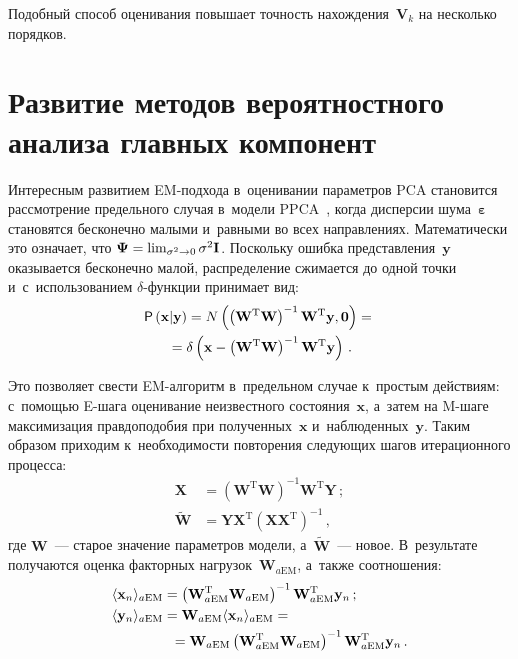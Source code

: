 \begin{multicols}{2}
     Подобный способ оценивания повышает точность 
нахождения~$\mathbf{V}_k$ на несколько порядков.
     
\section{Развитие методов вероятностного анализа главных компонент}

     Интересным развитием EM-под\-хо\-да в~оценивании параметров PCA 
становится рассмотрение предель\-ного случая в~модели PPCA~\cite{5-kri}, когда 
дис\-пер\-сии шума~${\boldsymbol{\varepsilon}}$ становятся бесконечно малыми и~равными во всех направлениях. Математически это означает, что 
${\boldsymbol{\Psi}}\hm= \lim\nolimits_{\sigma^2\to 0} \sigma^2\mathbf{I}$. 
Поскольку ошибка представления~$\mathbf{y}$ оказывается бесконечно малой, 
распределение сжимается до одной точки и~с~использованием  
$\delta$-функ\-ции принимает вид:
     \begin{multline*}
     {\sf P}\left(\mathbf{x}\vert \mathbf{y}\right) 
=N\left(\left(\mathbf{W}^{\mathrm{T}}\mathbf{W}\right)^{-1} 
\mathbf{W}^{\mathrm{T}} \mathbf{y},\mathbf{0}\right)={}\\
{}=\delta
     \left(\mathbf{x} -\left(\mathbf{W}^{\mathrm{T}} \mathbf{W}\right)^{-1} 
\mathbf{W}^{\mathrm{T}} \mathbf{y}\right)\,.
     \end{multline*}
     
     Это позволяет свести EM-ал\-го\-ритм в~предельном случае к~простым 
действиям: с~по\-мощью \mbox{E-ша}\-га оценивание неизвестного 
состояния~$\mathbf{x}$, а~затем на M-ша\-ге максимизация правдоподобия 
при полученных~$\mathbf{x}$ и~наблюденных~$\mathbf{y}$. Таким образом 
приходим к~необходимости повторения следующих шагов итерационного 
процесса:
     \begin{align*}
     \mathbf{X} &= \left(\mathbf{W}^{\mathrm{T}} \mathbf{W}\right)^{-1} 
\mathbf{W}^{\mathrm{T}} \mathbf{Y}\,;\\
     \widetilde{\mathbf{W}} &= \mathbf{YX}^{\mathrm{T}} 
\left(\mathbf{XX}^{\mathrm{T}}\right)^{-1}\,,
     \end{align*}
где $\mathbf{W}$~--- старое значение параметров модели, 
а~$\widetilde{\mathbf{W}}$~--- новое. В~результате получаются оценка 
факторных нагрузок~$\mathbf{W}_{a\mathrm{EM}}$, а~также соотношения:
\begin{align*}
\langle \mathbf{x}_n\rangle_{a\mathrm{EM}} &=\left(\mathbf{W}_{a\mathrm{EM}}^{\mathrm{T}} 
\mathbf{W}_{a\mathrm{EM}}\right)^{-1} \mathbf{W}^{\mathrm{T}}_{a\mathrm{EM}} \mathbf{y}_n\,;
\\
\langle \mathbf{y}_n\rangle_{a\mathrm{EM}} &=\mathbf{W}_{a\mathrm{EM}} \langle 
\mathbf{x}_n\rangle_{a\mathrm{EM}} = {}\\
&\hspace*{2mm}{}=
\mathbf{W}_{a\mathrm{EM}}\left(\mathbf{W}^{\mathrm{T}}_{a\mathrm{EM}} 
\mathbf{W}_{a\mathrm{EM}}\right)^{-1} \mathbf{W}^{\mathrm{T}}_{a\mathrm{EM}} 
\mathbf{y}_n\,.
\end{align*}
     

\end{multicols}
